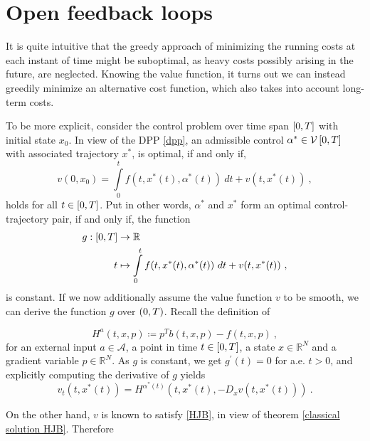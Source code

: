 \section{Open feedback loops}

It is quite intuitive that the greedy approach of minimizing the running costs at each instant of time might be suboptimal, as heavy costs possibly arising in the future, are neglected. Knowing the value function, it turns out we can instead greedily minimize an alternative  cost function, which also takes into account long-term costs.

To be more explicit, consider the control problem over time span $ \left[ 0, T \right] $ with initial state $ x_0 $. In view of the DPP \eqref{dpp}, an admissible control $ \alpha^* \in \mathcal{V}\left[ {0}, T \right] $ with associated trajectory $ x^* $, is optimal, if and only if,
\begin{equation*}
	v(0, x_0) = \int\limits_{0}^{t} f(t, x^{*}(t), \alpha^{*}(t)) \  dt + v(t, x^{*}(t)) \ ,
\end{equation*}
holds for all $ t \in \left[ 0, T \right] $. Put in other words, $ \alpha^* $ and $ x^* $ form an optimal control-trajectory pair, if and only if, the function
\begin{align*}
	g : \left[ 0, T \right] &\to \mathbb{R} \\
	t &\mapsto \int\limits_{0}^{t} f(t, x^{*}(t), \alpha^{*}(t)) \  dt + v(t, x^{*}(t)) \ ,
\end{align*}
is constant. If we now additionally assume the value function $ v $ to be smooth, we can derive the function $ g $ over $ \left(0, T\right) $. Recall the definition of

\begin{equation*}
	H^a(t, x, p) \coloneqq p^T b(t, x, p) - f(t, x, p) \ ,
\end{equation*}
for an external input $ a \in \mathcal{A} $, a point in time $ t \in \left[ 0, T \right] $, a state $ x \in \mathbb{R}^N $ and a gradient variable $ p \in \mathbb{R}^N $.
As $ g $ is constant, we get $ g^{\prime}(t) = 0 $ for a.e. $ t > 0 $, and explicitly computing the derivative of $ g $ yields
\begin{equation}
\label{control Hamiltonian}
	v_t(t, x^{*}(t)) = H^{\alpha^{*}(t)}(t, x^{*}(t), -D_x v(t, x^{*}(t))) \ .
\end{equation}

On the other hand, $ v $ is known to satisfy \eqref{HJB}, in view of theorem \ref{classical solution HJB}. Therefore

